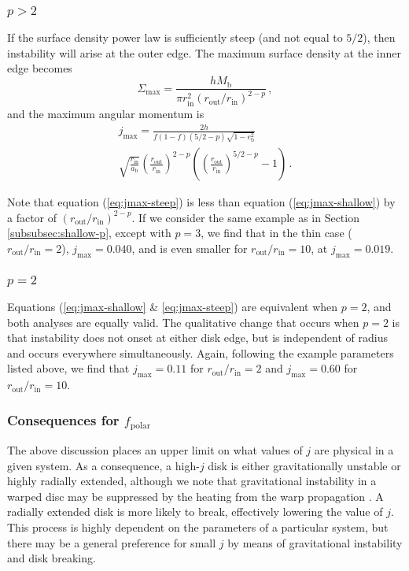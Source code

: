 \documentclass[twocolumn]{aastex631}
\begin{document}
\subsubsection{$p>2$}
If the surface density power law is sufficiently steep (and not equal to $5/2$), then instability will arise at the outer edge. The maximum surface density at the inner edge becomes
\begin{equation}
    \Sigma_\text{max} = \frac{h M_\text{b}}{\pi r_\text{in}^2 (r_\text{out}/r_\text{in})^{2-p}}\, ,
\end{equation}
and the maximum angular momentum is
\begin{multline}
    \label{eq:jmax-steep}
    j_\text{max} = \frac{2h}{f (1-f) (5/2 - p)\sqrt{1-e_\text{b}^2}} \\ 
    \sqrt{\frac{r_\text{in}}{a_\text{b}}} \left( \frac{r_\text{out}}{r_\text{in}}\right)^{2-p} \left( \left( \frac{r_\text{out}}{r_\text{in}} \right)^{5/2 - p}- 1\right) \, .
\end{multline}

Note that equation (\ref{eq:jmax-steep}) is less than equation ({\ref{eq:jmax-shallow}}) by a factor of $(r_\text{out}/r_\text{in})^{2-p}$. If we consider the same example as in Section \ref{subsubsec:shallow-p}, except with $p=3$, we find that in the thin case ($r_\text{out}/r_\text{in} = 2$), $j_\text{max} = 0.040$, and is even smaller for $r_\text{out}/r_\text{in} = 10$, at  $j_\text{max} = 0.019$.

\subsubsection{$p=2$}
Equations (\ref{eq:jmax-shallow} \& \ref{eq:jmax-steep}) are equivalent when $p=2$, and both analyses are equally valid. The qualitative change that occurs when $p=2$ is that instability does not onset at either disk edge, but is independent of radius and occurs everywhere simultaneously. Again, following the example parameters listed above, we find that $j_\text{max} = 0.11$ for $r_\text{out}/r_\text{in} = 2$ and $j_\text{max} = 0.60$ for $r_\text{out}/r_\text{in} = 10$.

\subsubsection{Consequences for $f_\text{polar}$}
The above discussion places an upper limit on what values of $j$ are physical in a given system. As a consequence, a high-$j$ disk is either gravitationally unstable or highly radially extended, although we note that gravitational instability in a warped disc may be suppressed by the heating from the warp propagation \citep{rowther2022}.  A radially extended disk is more likely to break, effectively lowering the value of $j$. This process is highly dependent on the parameters of a particular system, but there may be a general preference for small $j$ by means of gravitational instability and disk breaking. 
\end{document}
